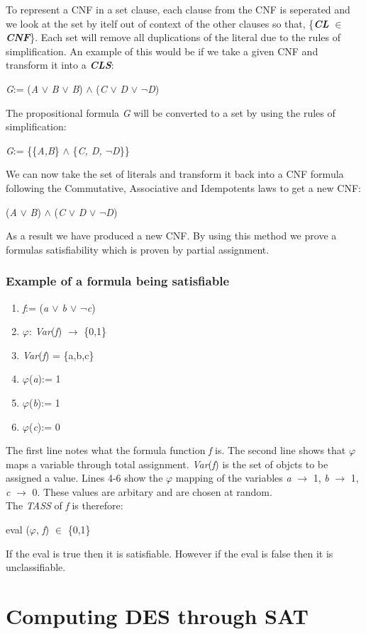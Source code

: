 \documentclass[11pt,a4paper]{report}
\begin{document}
To represent a CNF in a set clause, each clause from the CNF is seperated and we look at the set by itelf out of context of the other clauses so that, \{\textbf{\textit{CL}} $\in$ \textbf{\textit{CNF}}\}. Each set will remove all duplications of the literal due to the rules of simplification. An example of this would be if we take a given CNF and transform it into a \textbf{\textit{CLS}}: 

\begin{center}
\textit{G}:= (\textit{A} $\lor$ \textit{B} $\lor$ \textit{B}) $\land$ (\textit{C} $\lor$ \textit{D} $\lor$ $\neg$\textit{D})
\end{center}

The propositional formula \textit{G} will be converted to a set by using the rules of simplification:

\begin{center}
\textit{G}:= \{\{\textit{A,B}\} $\land$ \{\textit{C, D, $\neg$D}\}\} 
\end{center}

We can now take the set of literals and transform it back into a CNF formula following the Commutative, Associative and Idempotents laws to get a new CNF:

\begin{center}
(\textit{A} $\lor$ \textit{B}) $\land$ (\textit{C} $\lor$ \textit{D} $\lor$ $\neg$\textit{D})
\end{center}
As a result we have produced a new CNF. By using this method we prove a formulas satisfiability which is proven by partial assignment. 


\subsection{Example of a formula being satisfiable}

\begin{enumerate}
\item \textit{f}:= (\textit{a $\lor$ b $\lor$ $\neg$c})
\item $\varphi$: \textit{Var}(\textit{f}) $\rightarrow$ \{0,1\}
\item \textit{Var}(\textit{f}) = \{a,b,c\}
\item $\varphi$(\textit{a}):= 1
\item $\varphi$(\textit{b}):= 1
\item $\varphi$(\textit{c}):= 0
\end{enumerate}

The first line notes what the formula function \textit{f} is. The second line shows that $\varphi$ maps a variable through total assignment. \textit{Var}(\textit{f}) is the set of objcts to be assigned a value. Lines 4-6 show the $\varphi$ mapping of the variables \textit{a} $\rightarrow$ 1, \textit{b} $\rightarrow$ 1, \textit{c} $\rightarrow$ 0. These values are arbitary and are chosen at random. \\
The \textit{TASS} of \textit{f} is therefore:

\begin{center}
eval ($\varphi$, \textit{f}) $\in$ \{0,1\}
\end{center}
If the eval is true then it is satisfiable. However if the eval is false then it is unclassifiable. 


\chapter{Computing DES through SAT}
\label{cha:dessat}
\end{document}
